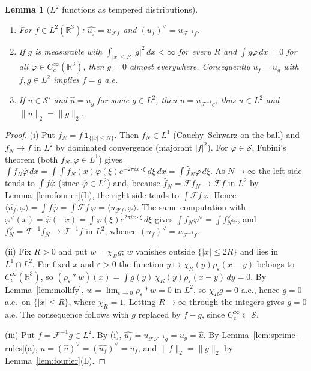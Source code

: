 \documentclass[11pt]{article}
\newtheorem{lemma}[theorem]{Lemma}
\theoremstyle{definition}
\theoremstyle{plain}
\newcommand{\R}{\mathbb R}
\begin{document}
\begin{lemma}[$L^2$ functions as tempered distributions]\label{lem:compat}
\sloppy
\begin{enumerate}
\item[(i)] For $f\in L^2(\R^3)$: $\widehat{u_f}=u_{\mathcal Ff}$ and
$(u_f)^\vee=u_{\mathcal F^{-1}f}$.
\item[(ii)] If $g$ is measurable with $\int_{|x|\le R}|g|^2\,dx<\infty$ for
every $R$ and $\int g\varphi\,dx=0$ for all $\varphi\in C_c^\infty(\R^3)$,
then $g=0$ almost everywhere.  Consequently $u_f=u_g$ with $f,g\in L^2$
implies $f=g$ a.e.
\item[(iii)] If $u\in\mathcal S'$ and $\hat u=u_g$ for some $g\in L^2$, then
$u=u_{\mathcal F^{-1}g}$; thus $u\in L^2$ and $\|u\|_2=\|g\|_2$.
\end{enumerate}
\end{lemma}

\begin{proof}
(i) Put $f_N=f\,\mathbf 1_{\{|x|\le N\}}$.  Then $f_N\in L^1$ (Cauchy--Schwarz
on the ball) and $f_N\to f$ in $L^2$ by dominated convergence (majorant
$|f|^2$).  For $\varphi\in\mathcal S$, Fubini's theorem (both
$f_N,\varphi\in L^1$) gives
$\int f_N\hat\varphi\,dx=\int\!\!\int f_N(x)\varphi(\xi)e^{-2\pi ix\cdot\xi}\,d\xi\,dx
=\int\hat f_N\varphi\,d\xi$.  As $N\to\infty$ the left side tends to
$\int f\hat\varphi$ (since $\hat\varphi\in L^2$) and, because
$\hat f_N=\mathcal Ff_N\to\mathcal Ff$ in $L^2$ by
Lemma~\ref{lem:fourier}(L), the right side tends to $\int\mathcal Ff\,\varphi$.
Hence $\langle\widehat{u_f},\varphi\rangle=\int f\hat\varphi=\int\mathcal Ff\,\varphi
=\langle u_{\mathcal Ff},\varphi\rangle$.  The same computation with
$\varphi^\vee(x)=\hat\varphi(-x)=\int\varphi(\xi)e^{2\pi ix\cdot\xi}\,d\xi$
gives $\int f_N\varphi^\vee=\int f_N^\vee\varphi$, and
$f_N^\vee=\mathcal F^{-1}f_N\to\mathcal F^{-1}f$ in $L^2$, whence
$(u_f)^\vee=u_{\mathcal F^{-1}f}$.

(ii) Fix $R>0$ and put $w=\chi_Rg$; $w$ vanishes outside $\{|x|\le2R\}$ and
lies in $L^1\cap L^2$.  For fixed $x$ and $\varepsilon>0$ the function
$y\mapsto\chi_R(y)\rho_\varepsilon(x-y)$ belongs to $C_c^\infty(\R^3)$, so
$(\rho_\varepsilon*w)(x)=\int g(y)\,\chi_R(y)\rho_\varepsilon(x-y)\,dy=0$.
By Lemma~\ref{lem:mollify}, $w=\lim_{\varepsilon\to0}\rho_\varepsilon*w=0$
in $L^2$, so $\chi_Rg=0$ a.e., hence $g=0$ a.e.\ on $\{|x|\le R\}$, where
$\chi_R=1$.  Letting $R\to\infty$ through the integers gives $g=0$ a.e.
The consequence follows with $g$ replaced by $f-g$, since
$C_c^\infty\subset\mathcal S$.

(iii) Put $f=\mathcal F^{-1}g\in L^2$.  By (i),
$\widehat{u_f}=u_{\mathcal F\mathcal F^{-1}g}=u_g=\hat u$.  By
Lemma~\ref{lem:sprime-rules}(a), $u=(\hat u)^\vee=(\widehat{u_f})^\vee=u_f$, and
$\|f\|_2=\|g\|_2$ by Lemma~\ref{lem:fourier}(L).
\end{proof}
\end{document}
